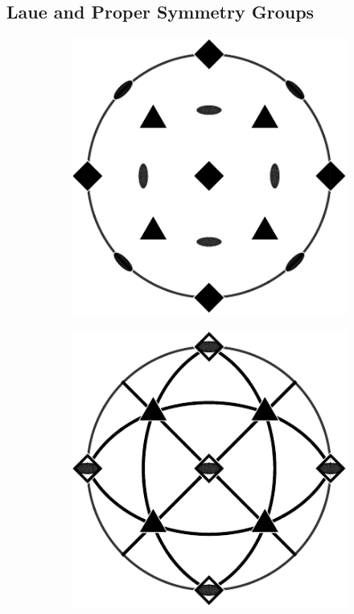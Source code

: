 \documentclass[compress]{beamer}
\begin{document}
\subsection*{Laue and Proper Symmetry Groups}
\begin{frame}[fragile]

  \begin{figure}[H]
    \centering
    \begin{subfigure}{0.3\textwidth}
      \includegraphics[width=\textwidth]{pic/432}
    \end{subfigure}
    \begin{subfigure}{0.3\textwidth}
      \includegraphics[width=\textwidth]{pic/43m}

\end{subfigure}
\end{figure}
\end{frame}
\end{document}
